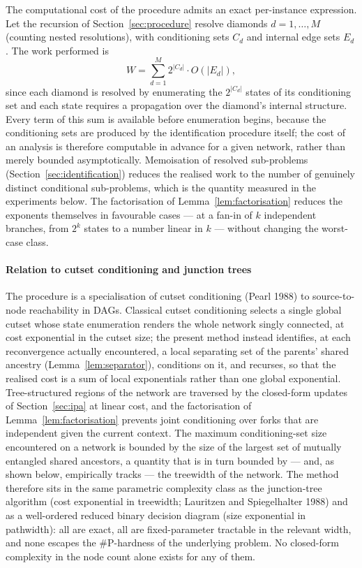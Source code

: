 \documentclass[preprint,12pt]{elsarticle}
\theoremstyle{definition}
\begin{document}
The computational cost of the procedure admits an exact per-instance expression. Let the recursion of
Section~\ref{sec:procedure} resolve diamonds $d=1,\dots,M$ (counting nested resolutions), with
conditioning sets $C_d$ and internal edge sets $E_d$. The work performed is
\begin{equation}\label{eq:work}
W=\sum_{d=1}^{M} 2^{|C_d|}\cdot O(|E_d|),
\end{equation}
since each diamond is resolved by enumerating the $2^{|C_d|}$ states of its conditioning set and each
state requires a propagation over the diamond's internal structure. Every term of this sum is available
before enumeration begins, because the conditioning sets are produced by the identification procedure
itself; the cost of an analysis is therefore computable in advance for a given network, rather than
merely bounded asymptotically. Memoisation of resolved sub-problems (Section~\ref{sec:identification})
reduces the realised work to the number of genuinely distinct conditional sub-problems, which is the
quantity measured in the experiments below. The factorisation of Lemma~\ref{lem:factorisation} reduces
the exponents themselves in favourable cases --- at a fan-in of $k$ independent branches, from $2^k$
states to a number linear in $k$ --- without changing the worst-case class.

\paragraph{Relation to cutset conditioning and junction trees}
The procedure is a specialisation of cutset conditioning (Pearl 1988) to source-to-node reachability in
DAGs. Classical cutset conditioning selects a single global cutset whose state enumeration renders the
whole network singly connected, at cost exponential in the cutset size; the present method instead
identifies, at each reconvergence actually encountered, a local separating set of the parents' shared
ancestry (Lemma~\ref{lem:separator}), conditions on it, and recurses, so that the realised cost is a sum
of local exponentials rather than one global exponential. Tree-structured regions of the network are
traversed by the closed-form updates of Section~\ref{sec:ipa} at linear cost, and the factorisation of
Lemma~\ref{lem:factorisation} prevents joint conditioning over forks that are independent given the
current context. The maximum conditioning-set size encountered on a network is bounded by the size of
the largest set of mutually entangled shared ancestors, a quantity that is in turn bounded by --- and,
as shown below, empirically tracks --- the treewidth of the network. The method therefore sits in the
same parametric complexity class as the junction-tree algorithm (cost exponential in treewidth;
Lauritzen and Spiegelhalter 1988) and as a well-ordered reduced binary decision diagram (size
exponential in pathwidth): all are exact, all are fixed-parameter tractable in the relevant width, and
none escapes the \#P-hardness of the underlying problem. No closed-form complexity in the node count
alone exists for any of them.
\end{document}
